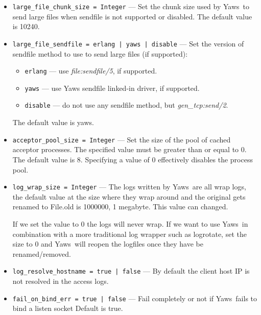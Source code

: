 \documentclass[11pt,oneside,english]{book}
\newcommand{\Yaws}            %
        {{\sc Yaws}}
\begin{document}
\begin{itemize}
\item        \verb+large_file_chunk_size = Integer+ ---
              Set the chunk size used by \Yaws\ to send large files when
              sendfile is not supported or disabled. The default value is 10240.

\item        \verb+large_file_sendfile = erlang | yaws | disable+ ---
              Set the version of sendfile method to use to send large files (if
              supported):
              \begin{itemize}
              \item \verb+erlang+ --- use \textit{file:sendfile/5}, if
                supported.
              \item \verb+yaws+ --- use Yaws sendfile linked-in driver, if
                supported.
              \item \verb+disable+ --- do not use any sendfile method, but
                \textit{gen\_tcp:send/2}.
              \end{itemize}
              The default value is yaws.


\item        \verb+acceptor_pool_size = Integer+ ---
              Set the size of the pool of cached acceptor
              processes. The specified value must be greater than or
              equal to 0. The default value is 8. Specifying a value
              of 0 effectively disables the process pool.

\item        \verb+log_wrap_size = Integer+ ---
              The logs written by \Yaws\ are all wrap logs, the default value at
              the size where they wrap around and the original gets renamed to
              File.old is 1000000, 1 megabyte. This value can changed.


              If we set the value to 0 the logs will never wrap. If we want to
              use \Yaws\ in combination with a more traditional log wrapper such
              as logrotate, set the size to 0 and \Yaws\ will reopen the
              logfiles once they have be renamed/removed.

\item        \verb+log_resolve_hostname = true | false+ ---
              By default the client host IP is not resolved in the access logs.

\item        \verb+fail_on_bind_err = true | false+ ---
              Fail completely or not if \Yaws\ fails to bind a listen socket
              Default is true.


\end{itemize}
\end{document}
